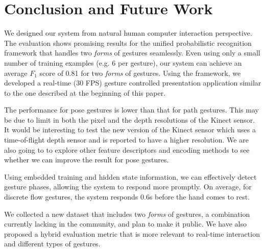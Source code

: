 \documentclass[conference]{IEEEtran}
\begin{document}
\section{Conclusion and Future Work}
We designed our system from natural human computer interaction perspective.
The evaluation shows promising results for the unified probabilistic
recognition framework that handles two \textit{forms}
of gestures seamlessly.
Even using only a small number of training examples (e.g. 6 per gesture), our
system can achieve an average $F_1$ score of 0.81 for two \textit{forms} of
gestures.
Using the framework, we developed a real-time (30 FPS) gesture controlled
presentation application similar to the one described at the beginning of this paper.

The performance for pose gestures is lower than that
for path gestures. This may be due to limit in
both the pixel and the depth resolutions of the Kinect sensor. It would be interesting to test
the new version of the Kinect sensor which uses a time-of-flight depth sensor
and is reported to have a higher resolution. We are also going to to explore
other feature descriptors and encoding methods to see whether we can
improve the result for pose gestures.

Using embedded training and hidden state information, we can effectively
detect gesture phases, allowing the system to respond more promptly. On average,
for discrete flow gestures, the system responds 0.6s before the hand comes to
rest. 

We collected a new dataset that includes two \textit{forms} of gestures, a
combination currently lacking in the community, and plan to make it
public. We have also proposed a hybrid evaluation metric
that is more relevant to real-time interaction and different types of gestures.
 





%
% 
% 

\end{document}
